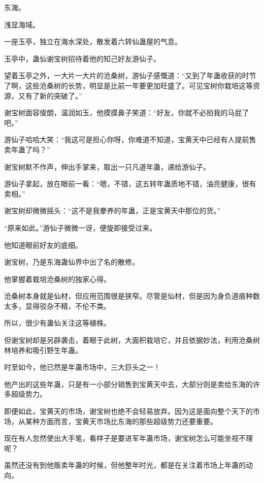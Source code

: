 
\begin{this_body}



东海。

浅显海域。

一座玉亭，独立在海水深处，散发着六转仙蛊屋的气息。

玉亭中，蛊仙谢宝树招待着他的知己好友游仙子。

望着玉亭之外，一大片一大片的沧桑树，游仙子感慨道：“又到了年蛊收获的时节了啊，这些沧桑树的长势，明显是比前一年要更加旺盛了。可见宝树你栽培这等资源，又有了新的突破了。”

谢宝树面容俊朗，温润如玉，他摸摸鼻子笑道：“好友，你就不必拍我的马屁了吧。”

游仙子哈哈大笑：“我这可是担心你呀，你难道不知道，宝黄天中已经有人提前售卖年蛊了吗？”

谢宝树默不作声，伸出手掌来，取出一只凡道年蛊，递给游仙子。

游仙子拿起，放在眼前一看：“嗯，不错，这五转年蛊质地不错，油亮健康，很有卖相。”

谢宝树却微微摇头：“这不是我豢养的年蛊，正是宝黄天中那位的货。”

“原来如此。”游仙子微微一讶，便旋即接受过来。

他知道眼前好友的底细。

谢宝树，乃是东海蛊仙界中出了名的散修。

他掌握着栽培沧桑树的独家心得。

沧桑树本身就是仙材，但应用范围很是狭窄。尽管是仙材，但是因为身负道痕种数太多，显得驳杂不精，不伦不类。

所以，很少有蛊仙关注这等植株。

但谢宝树却是另辟袭击，着眼于此树，大面积栽培它，并且依据妙法，利用沧桑树林培养和吸引野生年蛊。

时至如今，他已然是年蛊市场中，三大巨头之一！

他产出的这些年蛊，只是有一小部分销售到宝黄天中去，大部分则是卖给东海的许多超级势力。

即便如此，宝黄天的市场，谢宝树也绝不会轻易放弃。因为这是面向整个天下的市场，从某种方面而言，宝黄天市场比东海的那些超级势力还要重要。

现在有人忽然使出大手笔，看样子是要进军年蛊市场，谢宝树怎么可能坐视不理呢？

虽然还没有到他贩卖年蛊的时候，但他整年时光，都是在关注着市场上年蛊的动向。


\end{this_body}
